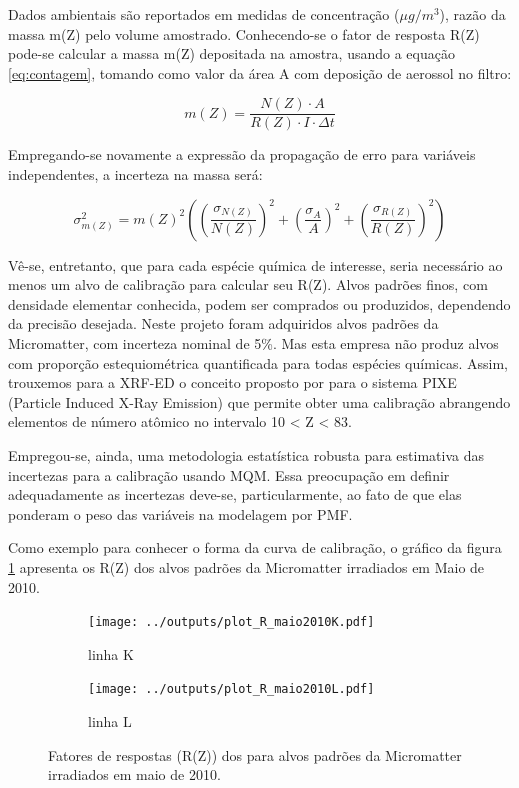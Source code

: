 Dados ambientais são reportados em medidas de concentração ($\mu g/m^3$),
razão da massa m(Z) pelo volume amostrado. Conhecendo-se o fator de resposta 
R(Z) pode-se calcular a massa m(Z) depositada na amostra, usando a equação 
\ref{eq:contagem}, tomando como valor da área A com deposição de aerossol
no filtro:

\begin{equation}
  \label{eq:xrfedmassa}
  m(Z) = \frac{N(Z) \cdot A}{ R(Z) \cdot I \cdot \Delta t}
\end{equation}

Empregando-se novamente a expressão da propagação de erro para variáveis 
independentes, a incerteza na massa será:

\begin{equation}
  \label{eq:erro_massa}
  \sigma_{m(Z)}^2 = {m(Z)}^2 \left( \left(\frac{\sigma_{N(Z)}}{N(Z)}\right)^2 + 
                                  \left(\frac{\sigma_A}{A}\right)^2 + 
                                  \left(\frac{\sigma_{R(Z)}}{R(Z)}\right)^2 
                             \right)
\end{equation}


Vê-se, entretanto, que para cada espécie química de interesse, seria necessário
ao menos um alvo de calibração para calcular seu R(Z). Alvos padrões finos, 
com densidade elementar conhecida, podem ser comprados ou produzidos, dependendo
da precisão desejada. Neste projeto foram adquiridos alvos padrões da 
Micromatter, com incerteza nominal de 5\%. Mas esta empresa não produz alvos 
com proporção estequiométrica quantificada para todas espécies químicas.
Assim, trouxemos para a XRF-ED o conceito proposto por \citep{tabacniks2000}
para o sistema PIXE (Particle Induced X-Ray Emission) que permite obter uma 
calibração abrangendo elementos de número atômico no intervalo 10 < Z < 83. 
 
Empregou-se, ainda, uma metodologia estatística robusta para estimativa das 
incertezas para a calibração usando MQM. Essa preocupação em definir 
adequadamente as incertezas deve-se, particularmente, ao fato de que elas 
ponderam o peso das variáveis na modelagem por PMF.

Como exemplo para conhecer o forma da curva de calibração, o gráfico da figura 
\ref{fg:edxrfcalib} apresenta os R(Z) dos alvos padrões da Micromatter 
irradiados em Maio de 2010. 

\begin{figure}[H]
  \begin{subfigure}[b]{0.45\textwidth}
    \texttt{[image: ../outputs/plot\_R\_maio2010K.pdf]}
    \caption{linha K}
  \end{subfigure}%
  \begin{subfigure}[b]{0.45\textwidth}
    \texttt{[image: ../outputs/plot\_R\_maio2010L.pdf]}
    \caption{linha L}
  \end{subfigure}
  \caption{Fatores de respostas (R(Z)) dos para alvos padrões da 
           Micromatter irradiados em maio de 2010. 
           \label{fg:edxrfcalib}}
\end{figure}

